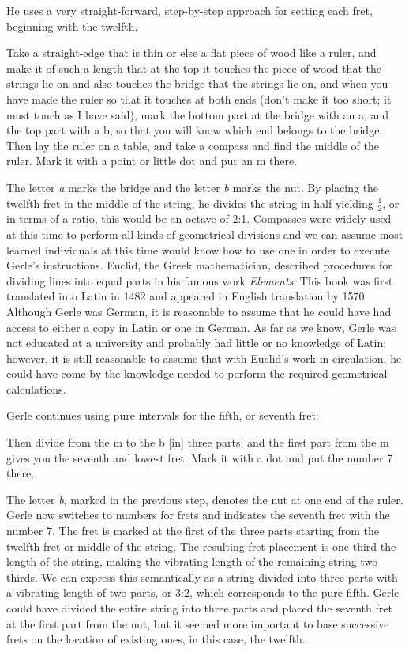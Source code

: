He uses a very straight-forward, step-by-step approach for setting each fret, beginning
with the twelfth.
\begin{blocks}
Take a straight-edge that is thin or else a flat piece of wood like a ruler, and make it
of such a length that at the top it touches the piece of wood that the strings lie on and
also touches the bridge that the strings lie on, and when you have made the ruler so that
it touches at both ends (don't make it too short; it must touch as I have said), mark the
bottom part at the bridge with an a, and the top part with a b, so that you will know
which end belongs to the bridge.  Then lay the ruler on a table, and take a compass and
find the middle of the ruler.  Mark it with a point or little dot and put an m there.
\end{blocks}
The letter \textit{a} marks the bridge and the letter \textit{b} marks the nut.
By placing the twelfth fret in the middle of the string, he divides the string in half
yielding $ \frac{1}{2} $, or in terms of a ratio, this would be an octave of 2:1.
Compasses were widely used at this time to perform all kinds of geometrical divisions and
we can assume most learned individuals at this time would know how to use one in order to
execute Gerle's instructions.  Euclid, the Greek mathematician, described procedures for
dividing lines into equal parts in his famous work \textit{Elements}.  This book was
first translated into Latin in 1482 and appeared in English translation by 1570.  Although
Gerle was German, it is reasonable to assume that he could have had access to either a
copy in Latin or one in German.  As far as we know, Gerle was not educated at a university
and probably had little or no knowledge of Latin; however, it is still reasonable to
assume that with Euclid's work in circulation, he could have come by the knowledge needed
to perform the required geometrical calculations.

Gerle continues using pure intervals for the fifth, or seventh fret:
\begin{blocks}
Then divide from the m to the b [in] three parts; and the first part from the m gives you
the seventh and lowest fret.  Mark it with a dot and put the number 7 there.
\end{blocks}
The letter \textit{b}, marked in the previous step, denotes the nut at one end of the ruler.
Gerle now switches to numbers for frets and indicates the seventh fret with the number 7.
The fret is marked at the first of the three parts starting from the twelfth fret or
middle of the string.  The resulting fret placement is one-third the length of the string,
making the vibrating length of the remaining string two-thirds. We can express this
semantically as a string divided into three parts with a vibrating length of two parts, or
3:2, which corresponds to the pure fifth.  Gerle could have divided the entire string into
three parts and placed the seventh fret at the first part from the nut, but it seemed more
important to base successive frets on the location of existing ones, in this case, the
twelfth.


